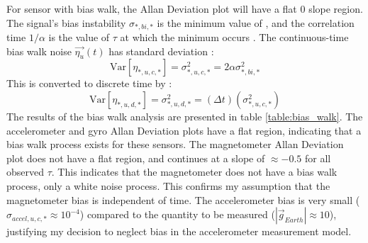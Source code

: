 \documentclass[conference]{IEEEtran}
\newcommand{\Var}{\mathrm{Var}}
\begin{document}
For sensor with bias walk, the Allan Deviation plot will have a flat $0$ slope region. The signal's bias instability $\sigma_{*,bi,*}$ is the minimum value of , and the correlation time $1/\alpha$ is the value of $\tau$ at which the minimum occurs \cite{UCAM-CL-TR-696}. The continuous-time bias walk noise $\vec{\eta_u}(t)$ has standard deviation \cite{1642588}:
\begin{equation}
    \Var[\eta_{*,u,c,*}] = \sigma_{*,u,c,*}^2 = 2 \alpha \sigma_{*,bi,*}^2
\end{equation}
This is converted to discrete time by \cite{1642588}:
\begin{equation}
    \Var[\eta_{*,u,d,*}] = \sigma_{*,u,d,*}^2 = (\Delta t) (\sigma_{*,u,c,*}^2)
\end{equation}
The results of the bias walk analysis are presented in table \ref{table:bias_walk}. The accelerometer and gyro Allan Deviation plots have a flat region, indicating that a bias walk process exists for these sensors. The magnetometer Allan Deviation plot does not have a flat region, and continues at a slope of $\approx -0.5$ for all observed $\tau$. This indicates that the magnetometer does not have a bias walk process, only a white noise process. This confirms my assumption that the magnetometer bias is independent of time. The accelerometer bias is very small ($\sigma_{accel,u,c,*} \approx 10^{-4}$) compared to the quantity to be measured ($|\vec{g}_{Earth}| \approx 10$), justifying my decision to neglect bias in the accelerometer measurement model.
\end{document}
